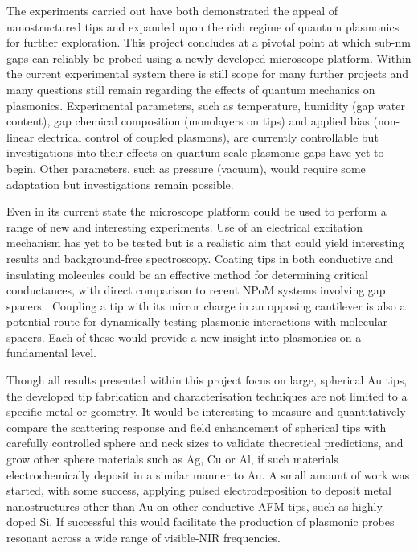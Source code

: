 \documentclass[12pt, a4paper, oneside]{book}
\begin{document}
The experiments carried out have both demonstrated the appeal of nanostructured tips and expanded upon the rich regime of quantum plasmonics for further exploration. This project concludes at a pivotal point at which sub-nm gaps can reliably be probed using a newly-developed microscope platform. Within the current experimental system there is still scope for many further projects and many questions still remain regarding the effects of quantum mechanics on plasmonics. Experimental parameters, such as temperature, humidity (gap water content), gap chemical composition (monolayers on tips) and applied bias (non-linear electrical control of coupled plasmons), are currently controllable but investigations into their effects on quantum-scale plasmonic gaps have yet to begin. Other parameters, such as pressure (vacuum), would require some adaptation but investigations remain possible.

Even in its current state the microscope platform could be used to perform a range of new and interesting experiments. Use of an electrical excitation mechanism has yet to be tested but is a realistic aim that could yield interesting results and background-free spectroscopy. Coating tips in both conductive and insulating molecules could be an effective method for determining critical conductances, with direct comparison to recent NPoM systems involving gap spacers \cite{mertens2013, benz2014, cha2014, denijs2014}. Coupling a tip with its mirror charge in an opposing cantilever is also a potential route for dynamically testing plasmonic interactions with molecular spacers. Each of these would provide a new insight into plasmonics on a fundamental level.

Though all results presented within this project focus on large, spherical Au tips, the developed tip fabrication and characterisation techniques are not limited to a specific metal or geometry. It would be interesting to measure and quantitatively compare the scattering response and field enhancement of spherical tips with carefully controlled sphere and neck sizes to validate theoretical predictions, and grow other sphere materials such as Ag, Cu or Al, if such materials electrochemically deposit in a similar manner to Au. A small amount of work was started, with some success, applying pulsed electrodeposition to deposit metal nanostructures other than Au on other conductive AFM tips, such as highly-doped Si. If successful this would facilitate the production of plasmonic probes resonant across a wide range of visible-NIR frequencies.
\end{document}
